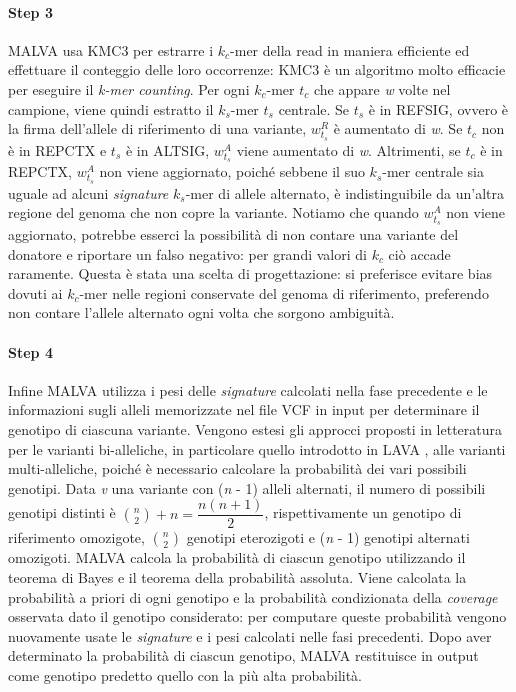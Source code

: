 \documentclass[../main.tex]{subfiles}
\begin{document}
\paragraph{Step 3} MALVA usa KMC3 \cite{Kokot2017KMC3} per estrarre i \textit{${k}_{c}$}-mer della read in maniera efficiente ed effettuare il conteggio delle loro occorrenze: KMC3 è un algoritmo molto efficacie per eseguire il \textit{k-mer counting}. Per ogni \textit{${k}_{c}$}-mer  \textit{${t}_{c}$} che appare \textit{w} volte nel campione, viene quindi estratto il \textit{${k}_{s}$}-mer  \textit{${t}_{s}$} centrale. Se \textit{${t}_{s}$} è in REFSIG, ovvero è la firma dell'allele di riferimento di una variante, \textit{$w_{{t}_{s}}^{R}$} è aumentato di \textit{w}. Se \textit{${t}_{c}$} non è in REPCTX e \textit{${t}_{s}$} è in ALTSIG, \textit{$w_{{t}_{s}}^{A}$} viene aumentato di \textit{w}. Altrimenti, se \textit{${t}_{c}$} è in REPCTX, \textit{$w_{{t}_{s}}^{A}$} non viene aggiornato, poiché sebbene il suo \textit{${k}_{s}$}-mer centrale sia uguale ad alcuni \textit{signature} \textit{${k}_{s}$}-mer di allele alternato, è indistinguibile da un'altra regione del genoma che non copre la variante. Notiamo che quando \textit{$w_{{t}_{s}}^{A}$} non viene aggiornato, potrebbe esserci la possibilità di non contare una variante del donatore e riportare un falso negativo: per grandi valori di  \textit{${k}_{c}$} ciò accade raramente. \textcolor{BurntOrange}{Questa è stata una scelta di progettazione: si preferisce evitare bias dovuti ai \textit{${k}_{c}$}-mer nelle regioni conservate del genoma di riferimento, preferendo non contare l'allele alternato ogni volta che sorgono ambiguità.}

\paragraph{Step 4} Infine MALVA utilizza i pesi delle \textit{signature} calcolati nella fase precedente e le informazioni sugli alleli memorizzate nel file VCF in input per determinare il genotipo di ciascuna variante. Vengono estesi gli approcci proposti in letteratura per le varianti bi-alleliche, in particolare quello introdotto in LAVA \cite{shajii2016lava}, alle varianti multi-alleliche, poiché è necessario calcolare la probabilità dei vari possibili genotipi. Data \textit{v} una variante con (\textit{n} - 1) alleli alternati, il numero di possibili genotipi distinti è $\binom{n}{2} + n = \dfrac{n(n+1)}{2}$, rispettivamente un genotipo di riferimento omozigote, $\binom{n}{2}$ genotipi eterozigoti e (\textit{n} - 1) genotipi alternati omozigoti. MALVA calcola la probabilità di ciascun genotipo utilizzando il teorema di Bayes e il teorema della probabilità assoluta. Viene calcolata la probabilità a priori di ogni genotipo e la probabilità condizionata della \textit{coverage} osservata
dato il genotipo considerato: per computare queste probabilità vengono nuovamente usate le \textit{signature} e i pesi calcolati nelle fasi precedenti. Dopo aver determinato la probabilità di ciascun genotipo, MALVA restituisce in output come genotipo predetto quello con la più alta probabilità.
\end{document}
